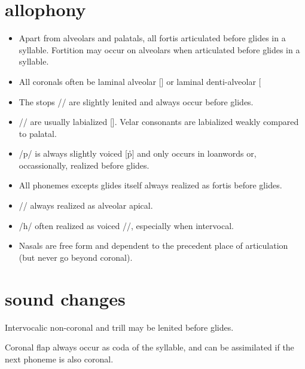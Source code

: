\section*{allophony}
\begin{itemize}
\item Apart from alveolars and palatals, all fortis articulated before glides in a syllable. Fortition may occur on alveolars when articulated before glides in a syllable.
\item All coronals often be laminal alveolar [] or laminal denti-alveolar [\SPL{\|[n \|[t \|[d \|[s \|[z]}
\item The stops // are slightly lenited and always occur before glides.
\item // are usually labialized []. Velar consonants are labialized weakly compared to palatal.
\item /p/ is always slightly voiced [\r p] and only occurs in loanwords or, occassionally, realized before glides.
\item All phonemes excepts glides itself always realized as fortis before glides.
\item // always realized as alveolar apical.
\item /h/ often realized as voiced //, especially when intervocal.
\item Nasals are free form and dependent to the precedent place of articulation (but never go beyond coronal).
\end{itemize}

\section*{sound changes}
Intervocalic non-coronal and trill may be lenited before glides.

\begin{quote}
    \begin{sample}
\end{sample}
\end{quote}

\noindent Coronal flap always occur as coda of the syllable, and can be assimilated if the next phoneme is also coronal.

\begin{quote}
\begin{sample}
\end{sample}
\end{quote}
